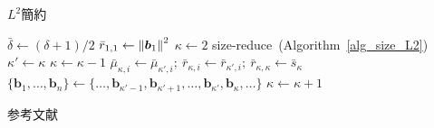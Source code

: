 \documentclass[12pt,aspectratio=169,xcolor=dvipsnames,table,dvipdfmx, leqno]{beamer}
\begin{document}
\begin{frame}
\begin{algorithm}[H]
    \footnotesize
    \begin{algorithmic}[1]
        \caption{\footnotesize $L^2$簡約}
        \label{alg_L2}
        \State $\bar{\delta}\gets(\delta+1)/2$
        \State $\bar{r}_{1,1}\gets\norm{\bm{b}_1}^2$
        \State $\kappa\gets 2$
            \State size-reduce~(Algorithm~\ref{alg_size_L2})
            \State $\kappa'\gets\kappa$
                \State $\kappa\gets\kappa-1$
            \EndWhile
                \State $\bar{\mu}_{\kappa, i}\gets\bar{\mu}_{\kappa', i};~\bar{r}_{\kappa, i}\gets\bar{r}_{\kappa', i};~\bar{r}_{\kappa, \kappa}\gets\bar{s}_{\kappa}$
            \EndFor
            \State $\{\bm{b}_1,\ldots,\bm{b}_n\}\gets\{\ldots, \bm{b}_{\kappa'-1}, \bm{b}_{\kappa'+1},\ldots,\bm{b}_{\kappa'}, \bm{b}_\kappa, \ldots\}$
            \State $\kappa\gets \kappa+1$
        \EndWhile
    \end{algorithmic}
\end{algorithm}
\end{frame}

\begin{frame}[allowframebreaks]{参考文献}
\beamertemplatetextbibitems


\end{frame}
\end{document}
